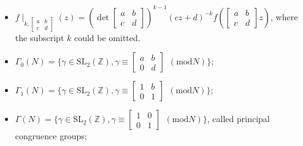 \begin{itemize}
  \item
  $f\mid_{k, \begin{bmatrix}
    a & b\\
    c & d
\end{bmatrix}}(z) = (\det \begin{bmatrix}
    a & b \\
    c & d
\end{bmatrix})^{k-1}(cz+d)^{-k} f(\begin{bmatrix} 
    a & b \\
    c & d
\end{bmatrix}z)$, where the subscript $k$ could be omitted.
  \item
  $\Gamma_0(N) = \{\gamma \in \mathrm{SL}_2(\mathbb{Z}), \gamma \equiv \begin{bmatrix}
    a & b \\
    0 & d
  \end{bmatrix} \ \ (\mathrm{mod} N) \}$;
  \item
   $\Gamma_1(N) = \{\gamma \in \mathrm{SL}_2(\mathbb{Z}), \gamma \equiv \begin{bmatrix}
    1 & b \\
    0 & 1
  \end{bmatrix} \ \ (\mathrm{mod} N) \}$;
    \item
   $\Gamma(N) = \{\gamma \in \mathrm{SL}_2(\mathbb{Z}), \gamma \equiv \begin{bmatrix}
    1 & 0 \\
    0 & 1
  \end{bmatrix} \ \ (\mathrm{mod} N) \}$, called principal congruence groups;
\end{itemize}

